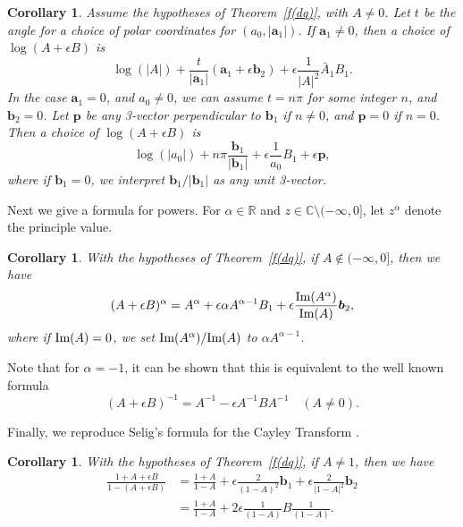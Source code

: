\documentclass[12pt,reqno]{amsart}
\newtheorem{cor}[theorem]{Corollary}
\begin{document}
\begin{cor}
\label{log dq}
Assume the hypotheses of Theorem~\ref{f(dq)}, with $A \ne 0$.  Let $t$ be the angle for a choice of polar coordinates for $(a_0, |\bm a_1|)$.  If $\bm a_1 \ne 0$, then a choice of $\log(A+\epsilon B)$ is
\begin{equation}
\log(|A|) + \dfrac t{|\bm a_1|} (\bm a_1 + \epsilon \bm b_2) + \epsilon \dfrac1{|A|^2} \bar A_1 B_1 .
\end{equation}
In the case $\bm a_1 = 0$, and $a_0 \ne 0$, we can assume $t = n \pi$ for some integer $n$, and $\bm b_2 = 0$.  Let $\bm p$ be any 3-vector perpendicular to $\bm b_1$ if $n \ne 0$, and $\bm p = 0$ if $n = 0$.  Then a choice of $\log(A + \epsilon B)$ is
\begin{equation}
\label{t=n pi}
\log(|a_0|) + n \pi \dfrac{\bm b_1}{|\bm b_1|} + \epsilon \dfrac 1{a_0} B_1 + \epsilon \bm p,
\end{equation}
where if $\bm b_1 = 0$, we interpret $\bm b_1 / |\bm b_1|$ as any unit 3-vector.
\end{cor}

Next we give a formula for powers.  For $\alpha \in \mathbb R$ and $z \in \mathbb C \setminus (-\infty,0]$, let $z^\alpha$ denote the principle value.

\begin{cor}
With the hypotheses of Theorem~\ref{f(dq)}, if $A \notin (-\infty,0]$, then we have
\begin{equation}
(A + \epsilon B )^\alpha =
A^\alpha + \epsilon \alpha A^{\alpha - 1} B_1 + \epsilon \frac{\text{\rm Im}(A^\alpha)}{\text{\rm Im}(A)} \bm b_2 ,
\end{equation}
where if $\text{\rm Im}(A) = 0$, we set ${\text{\rm Im}(A^\alpha)}/{\text{\rm Im}(A)}$ to $\alpha A^{\alpha - 1} $.
\end{cor}

Note that for $\alpha = -1$, it can be shown that this is equivalent to the well known formula
\begin{equation}
(A + \epsilon B)^{-1} = A^{-1} - \epsilon A^{-1} B A^{-1} \quad (A \ne 0).
\end{equation}

Finally, we reproduce Selig's formula for the Cayley Transform \cite{selig}.

\begin{cor}
With the hypotheses of Theorem~\ref{f(dq)}, if $A \ne 1$, then we have
\begin{equation}
\begin{aligned}
\frac{1 + A + \epsilon B}{1 - (A + \epsilon B)}
&=
\frac{1+A}{1-A} + \epsilon \frac{2}{(1-A)^2} \bm b_1 + \epsilon \frac{2}{|1-A|^2} \bm b_2 \\
&=
\frac{1+A}{1-A} + 2 \epsilon \frac{1}{(1-A)} B \frac{1}{(1-A)} .
\end{aligned}
\end{equation}
\end{cor}
\end{document}
